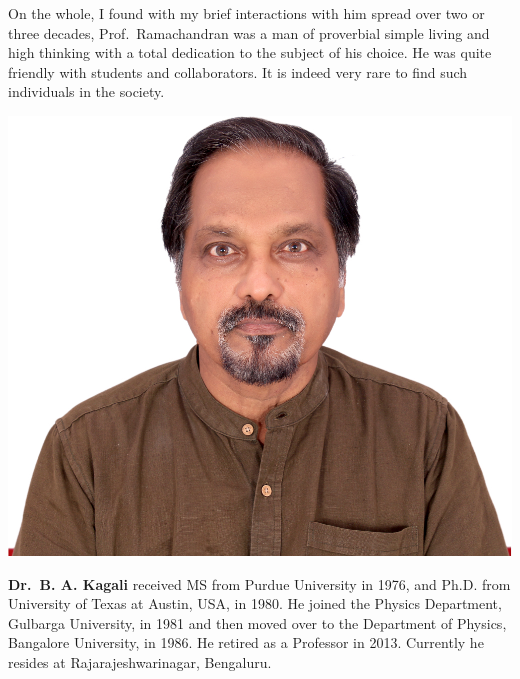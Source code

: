 On the whole, I found with my brief interactions with him spread over two or three decades, Prof.\ Ramachandran was a man of proverbial simple living and high thinking with a total dedication to the subject of his choice. He was quite friendly with students and collaborators. It is indeed very rare to find such individuals in the society.
\bigskip

\centerline{\includegraphics[scale=.6]{authorsphotos/Prof_B_A_Kagali.jpg}}
\smallskip

\bigskip

\noindent
\textbf{Dr.\ B. A. Kagali} received MS from Purdue University in 1976, and Ph.D. from University of Texas at Austin, USA, in 1980. He joined the Physics Department, Gulbarga University, in 1981 and then moved over to the Department of Physics, Bangalore University, in 1986. He retired as a Professor in 2013. Currently he resides at Rajarajeshwarinagar, Bengaluru.

